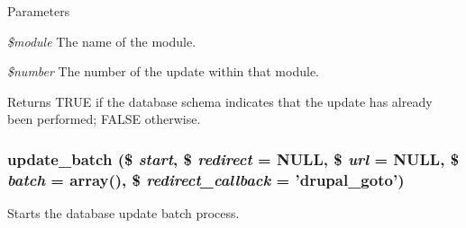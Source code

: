 \begin{DoxyParams}{Parameters}
\item[{\em \$module}]The name of the module. \item[{\em \$number}]The number of the update within that module.\end{DoxyParams}
\begin{DoxyReturn}{Returns}
TRUE if the database schema indicates that the update has already been performed; FALSE otherwise. 
\end{DoxyReturn}
\hypertarget{update_8inc_aa4dd3d84e553f6bf25ad19608152d5b7}{
\subsubsection[{update\_\-batch}]{\setlength{\rightskip}{0pt plus 5cm}update\_\-batch (\$ {\em start}, \/  \$ {\em redirect} = {\ttfamily NULL}, \/  \$ {\em url} = {\ttfamily NULL}, \/  \$ {\em batch} = {\ttfamily array()}, \/  \$ {\em redirect\_\-callback} = {\ttfamily 'drupal\_\-goto'})}}
\label{update_8inc_aa4dd3d84e553f6bf25ad19608152d5b7}
Starts the database update batch process.


